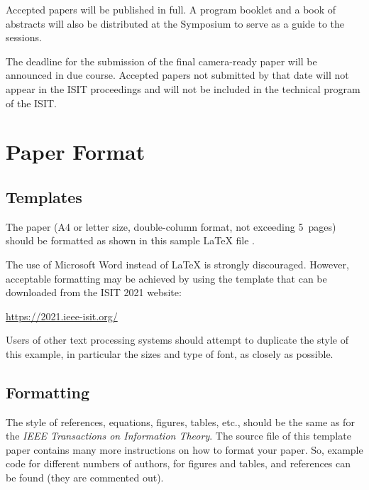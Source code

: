 \documentclass[conference,letterpaper]{IEEEtran}
\begin{document}
Accepted papers will be published in full. A program booklet and a book of abstracts will also be
distributed at the Symposium to serve as a guide to the sessions.

The deadline for the submission of the final camera-ready paper will
be announced in due course.  Accepted papers not submitted by that
date will not appear in the ISIT proceedings and will not be included
in the technical program of the ISIT.


\section{Paper Format}

\subsection{Templates}

The paper (A4 or letter size, double-column format, not exceeding
5~pages) should be formatted as shown in this sample \LaTeX{} file
\cite{Laport:LaTeX, GMS:LaTeXComp, oetiker_latex, typesetmoser}.

The use of Microsoft Word instead of \LaTeX{} is strongly
discouraged. However, acceptable formatting may be achieved by using
the template that can be downloaded from the ISIT 2021 website:
\begin{center}
  \url{https://2021.ieee-isit.org/}
\end{center}

Users of other text processing systems should attempt to duplicate the
style of this example, in particular the sizes and type of font, as
closely as possible.


\subsection{Formatting}

The style of references, equations, figures, tables, etc., should be
the same as for the \emph{IEEE Transactions on Information
  Theory}. The source file of this template paper contains many more
instructions on how to format your paper. So, example code for
different numbers of authors, for figures and tables, and references
can be found (they are commented out).

\end{document}
